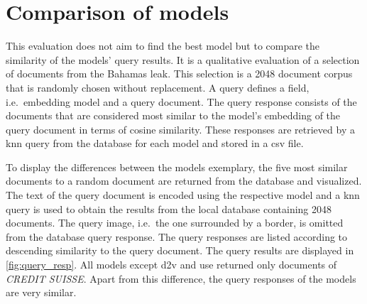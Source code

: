 \section{Comparison of models}\label{sec:evaluation-models}


This evaluation does not aim to find the best model but to compare the similarity of the models' query results.
It is a qualitative evaluation of a selection of documents from the Bahamas leak.
This selection is a 2048 document corpus that is randomly chosen without replacement.
A query defines a field, i.e.\ embedding model and a query document.
The query response consists of the documents that are considered most similar to the model's embedding of the query document in terms of cosine similarity.
These responses are retrieved by a \ac{knn} query from the database for each model and stored in a \ac{csv} file.


To display the differences between the models exemplary, the five most similar documents to a random document are returned from the database and visualized.
The text of the query document is encoded using the respective model and a 
\ac{knn} query is used to obtain the results from the local database containing 2048 documents.
The query image, i.e.\ the one surrounded by a border, is omitted from the database query response.
The query responses are listed according to descending similarity to the query document.
The query results are displayed in \autoref{fig:query_resp}.
All models except \ac{d2v} and \ac{use} returned only documents of \textit{CREDIT SUISSE}.
Apart from this difference, the query responses of the models are very similar.


